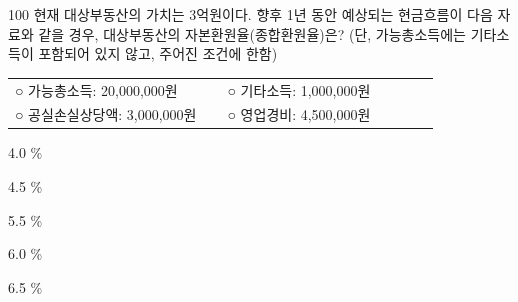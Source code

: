 \begin{question}{100}
현재 대상부동산의 가치는 3억원이다. 향후 1년 동안 예상되는 현금흐름이 다음 자료와 같을 경우, 대상부동산의 자본환원율(종합환원율)은? (단, 가능총소득에는 기타소득이 포함되어 있지 않고, 주어진 조건에 한함)
\begin{framedtext}
\begin{tabular}{@{}p{0.46\linewidth}p{0.46\linewidth}@{}}
○ 가능총소득: 20,000,000원 & ○ 기타소득: 1,000,000원 \\
○ 공실손실상당액: 3,000,000원 & ○ 영업경비: 4,500,000원 \\
\end{tabular}
\end{framedtext}
\begin{choices}
  \item 4.0 \%
  \item 4.5 \%
  \item 5.5 \%
  \item 6.0 \%
  \item 6.5 \%
\end{choices}
\end{question}
